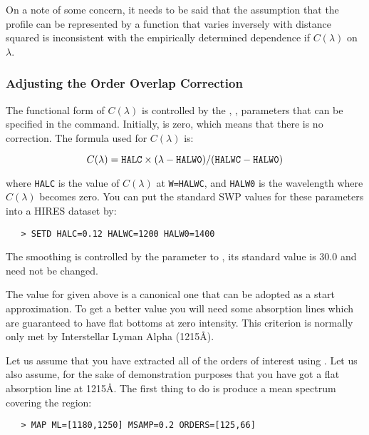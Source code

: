 On a note of some concern, it needs to be said that the assumption
that the profile can be represented by a function that varies inversely
with distance squared is inconsistent with the empirically determined
dependence if $C(\lambda)$ on $\lambda$\@.

\subsubsection{Adjusting the Order Overlap Correction}

The functional form of $C(\lambda)$ is controlled by the
, ,
 parameters that can be specified in the
 command.  Initially,
 is zero, which means that there is no
correction.  The formula used for $C(\lambda)$ is:

\begin{displaymath}
C(\lambda) =
{\tt HALC} \times (\lambda - {\tt HALW0}) / ({\tt HALWC} - {\tt HALW0})
\end{displaymath}

where \verb+HALC+ is the value of $C(\lambda)$ at \verb+W=HALWC+, and
\verb+HALW0+ is the wavelength where $C(\lambda)$ becomes zero.  You can put
the standard SWP values for these parameters into a HIRES dataset by:

\begin{verbatim}
   > SETD HALC=0.12 HALWC=1200 HALW0=1400
\end{verbatim}

The smoothing is controlled by the 
 parameter to , its
standard value is 30.0 and need not be changed.

The value for 
 given above is a canonical one that can be adopted as
a start approximation.  To get a better value you will need some absorption
lines which are guaranteed to have flat bottoms at zero intensity.  This
criterion is normally only met by Interstellar Lyman Alpha (1215\AA )\@.

Let us assume that you have extracted all of the orders of interest
using \@. Let us also assume, for the sake of
demonstration purposes that you have got a flat absorption line at 1215\AA\@.
The first thing to do is produce a mean spectrum covering the region:

\begin{verbatim}
   > MAP ML=[1180,1250] MSAMP=0.2 ORDERS=[125,66]
\end{verbatim}

